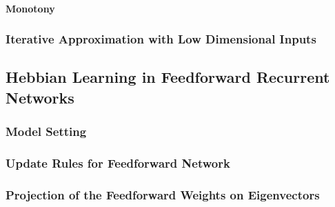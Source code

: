 \documentclass[11pt]{article}
\begin{document}
	\paragraph{Monotony}
	
	
	
	
	
	\subsubsection{Iterative Approximation with Low Dimensional Inputs}
	
	\clearpage
	\subsection{Hebbian Learning in Feedforward Recurrent Networks}
	\subsubsection{Model Setting}
	\subsubsection{Update Rules for Feedforward Network}
	\subsubsection{Projection of the Feedforward Weights on Eigenvectors}
	
	
\end{document}
